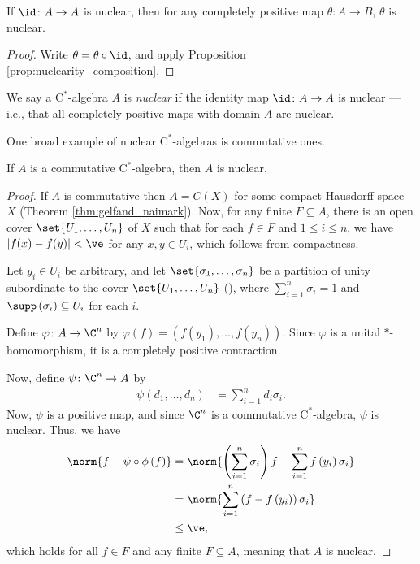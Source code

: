 \begin{corollary}
  If $\id\colon A\rightarrow A$ is nuclear, then for any completely positive map $\theta\colon A\rightarrow B$, $\theta$ is nuclear.
\end{corollary}
\begin{proof}
  Write $\theta = \theta\circ \id$, and apply Proposition \ref{prop:nuclearity_composition}.
\end{proof}
\begin{definition}\label{def:nuclear_cstar_algebra}
  We say a $\mathrm{C}^{\ast}$-algebra $A$ is \textit{nuclear} if the identity map $\id\colon A\rightarrow A$ is nuclear --- i.e., that all completely positive maps with domain $A$ are nuclear.
\end{definition}
One broad example of nuclear $\mathrm{C}^{\ast}$-algebras is commutative ones.
\begin{proposition}
  If $A$ is a commutative $\mathrm{C}^{\ast}$-algebra, then $A$ is nuclear.
\end{proposition}
\begin{proof}
  If $A$ is commutative then $A = C\left( X \right)$ for some compact Hausdorff space $X$ (Theorem \ref{thm:gelfand_naimark}). Now, for any finite $F\subseteq A$, there is an open cover $\set{U_1,\dots,U_n}$ of $X$ such that for each $f\in F$ and $1 \leq i \leq n$, we have $\left\vert f(x) - f(y) \right\vert < \ve$ for any $x,y\in U_i$, which follows from compactness.\newline

  Let $y_i\in U_i$ be arbitrary, and let $\set{\sigma_1,\dots,\sigma_n}$ be a partition of unity subordinate to the cover $\set{U_1,\dots,U_n}$ (\cite[Proposition 4.41]{folland_real_analysis}), where $\sum_{i=1}^{n}\sigma_i = 1$ and $\supp\left( \sigma_i \right) \subseteq U_i$ for each $i$.\newline

  Define $\varphi\colon A\rightarrow \C^n$ by $\varphi\left( f \right) = \left( f\left(y_1\right),\dots,f\left( y_n \right) \right)$. Since $\varphi$ is a unital $\ast$-homomorphism, it is a completely positive contraction.\newline

  Now, define $\psi\colon \C^n\rightarrow A$ by
  \begin{align*}
    \psi\left( d_1,\dots,d_n \right) &= \sum_{i=1}^{n}d_i\sigma_i.
  \end{align*}
  Now, $\psi$ is a positive map, and since $\C^n$ is a commutative $\mathrm{C}^{\ast}$-algebra, $\psi$ is nuclear. Thus, we have
  \begin{align*}
    \norm{f - \psi\circ\phi\left( f \right)} &= \norm{\left( \sum_{i=1}^{n}\sigma_i \right)f - \sum_{i=1}^{n}f\left( y_i \right)\sigma_i}\\
                                             &= \norm{\sum_{i=1}^{n}\left( f-f\left( y_i \right) \right)\sigma_i}\\
                                             &\leq \ve,
  \end{align*}
  which holds for all $f\in F$ and any finite $F\subseteq A$, meaning that $A$ is nuclear.
\end{proof}
